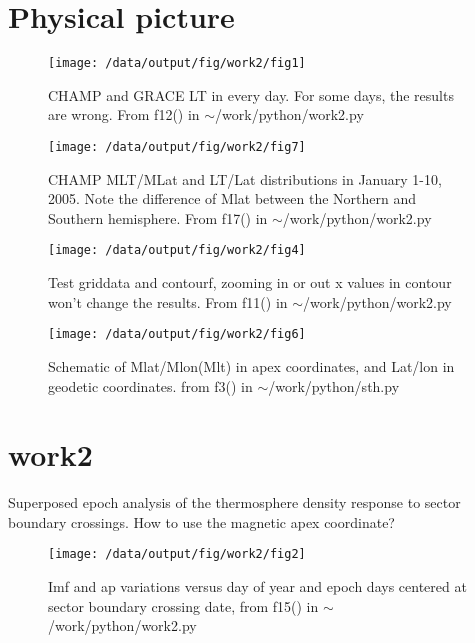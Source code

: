 \documentclass[12pt,a4paper]{article}
\begin{document}
\section{Physical picture}
\begin{figure}[!ht]
    \begin{center}
        \texttt{[image: /data/output/fig/work2/fig1]}
        \caption{CHAMP and GRACE LT in every day. For some days, the results are wrong. From f12() in $\sim$/work/python/work2.py}
    \end{center}
    \label{fig1}
\end{figure}

\begin{figure}[!ht]
    \begin{center}
        \texttt{[image: /data/output/fig/work2/fig7]}
        \caption{ CHAMP MLT/MLat and LT/Lat distributions in January 1-10, 2005. Note the difference of Mlat between the Northern and Southern hemisphere. From f17() in $\sim$/work/python/work2.py}
    \end{center}
    \label{fig2}
\end{figure}

\begin{figure}[!ht]
    \begin{center}
        \texttt{[image: /data/output/fig/work2/fig4]}
        \caption{Test griddata and contourf, zooming in or out x values in contour won't change the results. From f11() in $\sim$/work/python/work2.py}
    \end{center}
    \label{fig3}
\end{figure}

\begin{figure}[!ht]
    \begin{center}
        \texttt{[image: /data/output/fig/work2/fig6]}
        \caption{Schematic of Mlat/Mlon(Mlt) in apex coordinates, and Lat/lon in geodetic coordinates. from f3() in $\sim$/work/python/sth.py}
    \end{center}
    \label{fig4}
\end{figure}
\newpage

\section{work2}
Superposed epoch analysis of the thermosphere density response to sector boundary crossings.
How to use the magnetic apex coordinate?
\begin{figure}[!ht]
    \begin{center}
        \texttt{[image: /data/output/fig/work2/fig2]}
        \caption{Imf and ap variations versus day of year and epoch days centered at sector boundary crossing date, from f15() in $\sim$/work/python/work2.py}
    \end{center}
    \label{fig5}
\end{figure}
\end{document}
